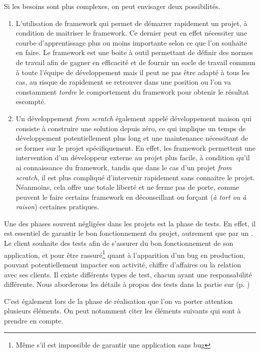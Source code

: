 Si les besoins sont plus complexes, on peut envisager deux possibilités.

\begin{enumerate}
	\item L'utilisation de \gls{framework} qui permet de démarrer rapidement un projet, à condition de maitriser le \gls{framework}. Ce dernier peut en effet nécessiter une courbe d'apprentissage plus ou moins importante selon ce que l'on souhaite en faire. Le \gls{framework} est une boite à outil permettant de définir des normes de travail afin de gagner en efficacité et de fournir un socle de travail commun à toute l'équipe de développement mais il peut ne pas être adapté à tous les cas, au risque de rapidement se retrouver dans une position ou l'on va constamment \emph{tordre} le comportement du \gls{framework} pour obtenir le résultat escompté.
	\item Un développement \emph{from scratch} également appelé développement maison qui consiste à construire une solution depuis zéro, ce qui implique un temps de développement potentiellement plus long et une maintenance nécessitant de se former sur le projet spécifiquement. En effet, les \gls{framework} permettent une intervention d'un développeur externe au projet plus facile, à condition qu'il ai connaissance du \gls{framework}, tandis que dans le cas d'un projet \emph{from scratch}, il est plus compliqué d'intervenir rapidement sans connaitre le projet. Néanmoins, cela offre une totale liberté et ne ferme pas de porte, comme peuvent le faire certains \gls{framework} en déconseillant ou forçant (\emph{à tort ou à raison}) certaines pratiques.
\end{enumerate}

Une des phases souvent négligées dans les projets est la phase de tests. En effet, il est essentiel de garantir le bon fonctionnement du projet, autrement que par un . Le client souhaite des tests afin de s'assurer du bon fonctionnement de son application, et pour être rassuré\footnote{Même s'il est impossible de garantir une application sans bug} quant à l'apparition d'un bug en production, pouvant potentiellement impacter son activité, chiffre d'affaires ou la relation avec ses clients. Il existe différents types de test, chacun ayant une responsabilité différente. Nous aborderons les détails à propos des tests dans la partie sur  (p. \pageref{importance-test})

C'est également lors de la phase de réalisation que l'on va porter attention plusieurs éléments. On peut notamment citer les éléments suivants qui sont à prendre en compte.

